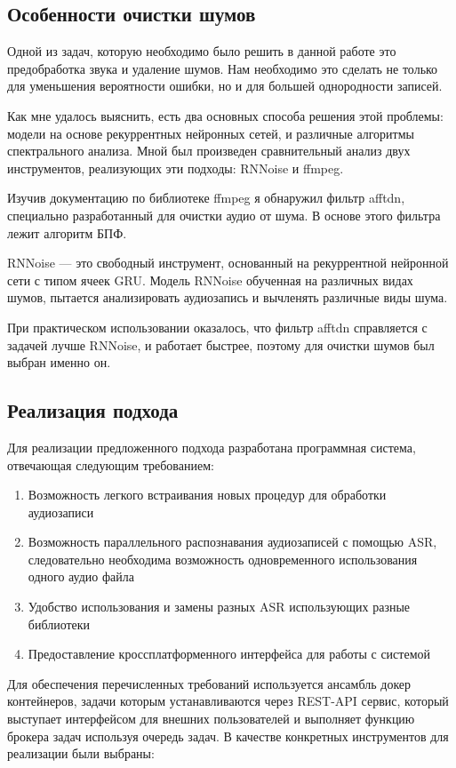 \documentclass[conference]{IEEEtran}
\begin{document}
\subsection{Особенности очистки шумов}
Одной из задач, которую необходимо было решить в данной работе это предобработка звука и удаление шумов. Нам необходимо это сделать не только для уменьшения вероятности ошибки, но и для большей однородности записей.

Как мне удалось выяснить, есть два основных способа решения этой проблемы: модели на основе рекуррентных нейронных сетей, и различные алгоритмы спектрального анализа.
Мной был произведен сравнительный анализ двух инструментов, реализующих эти подходы: RNNoise и ffmpeg.

Изучив документацию по библиотеке ffmpeg я обнаружил фильтр afftdn, специально разработанный для очистки аудио от шума. В основе этого фильтра лежит алгоритм БПФ.

RNNoise — это свободный инструмент, основанный на рекуррентной нейронной сети с типом ячеек GRU. Модель RNNoise обученная на различных видах шумов, пытается анализировать аудиозапись и вычленять различные виды шума.

При практическом использовании оказалось, что фильтр afftdn справляется с задачей лучше RNNoise, и работает быстрее, поэтому для очистки шумов был выбран именно он.

\subsection{Реализация подхода}

Для реализации предложенного подхода разработана программная система, отвечающая следующим требованием:

\begin{enumerate}
\item  Возможность легкого встраивания новых процедур для обработки аудиозаписи
\item Возможность параллельного распознавания аудиозаписей с помощью ASR, следовательно необходима возможность одновременного использования одного аудио файла
\item Удобство использования и замены разных ASR использующих разные библиотеки
\item Предоставление кроссплатформенного интерфейса для работы с системой
\end{enumerate}

Для обеспечения перечисленных требований используется ансамбль докер контейнеров, задачи которым устанавливаются через REST-API сервис, который выступает интерфейсом для внешних пользователей и выполняет функцию брокера задач используя очередь задач.
В качестве конкретных инструментов для реализации были выбраны:
\end{document}
